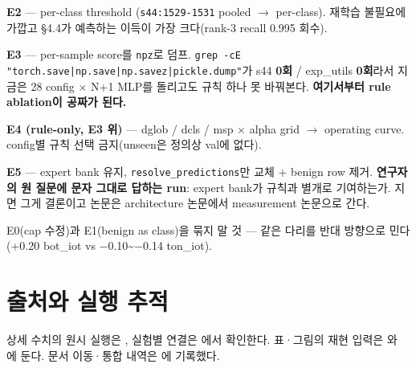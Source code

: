\textbf{E2} — per-class threshold (\texttt{s44:1529\allowbreak{}-\allowbreak{}1531} pooled  \ensuremath{\rightarrow}  per-class). 재학습 불필요에 가깝고 §4.4가 예측하는 이득이 가장 크다(rank-3 recall 0.995 회수).

\textbf{E3} — per-sample score를 \texttt{npz}로 덤프. \texttt{grep -\allowbreak{}cE\allowbreak{} "torch.\allowbreak{}save|np.\allowbreak{}save|np.\allowbreak{}savez|pi\allowbreak{}ckle.\allowbreak{}dum\allowbreak{}p"}가 s44 \textbf{0회} /\allowbreak{} exp\_\allowbreak{}utils \textbf{0회}라서 지금은 28 config × N+\allowbreak{}1 MLP를 돌리고도 규칙 하나 못 바꿔본다. \textbf{여기서부터 rule ablation이 공짜가 된다.}

\textbf{E4 (rule-only, E3 위)} — dglob /\allowbreak{} dcls /\allowbreak{} msp × alpha grid  \ensuremath{\rightarrow}  operating curve. config별 규칙 선택 금지(unseen은 정의상 val에 없다).

\textbf{E5} — expert bank 유지, \texttt{resolve\_\allowbreak{}\allowbreak{}predicti\allowbreak{}ons}만 교체 +\allowbreak{} benign row 제거. \textbf{연구자의 원 질문에 문자 그대로 답하는 run}: expert bank가 규칙과 별개로 기여하는가. 지면 그게 결론이고 논문은 architecture 논문에서 measurement 논문으로 간다.

E0(cap 수정)과 E1(benign as class)을 묶지 말 것 — 같은 다리를 반대 방향으로 민다 (+\allowbreak{}0.20 bot\_\allowbreak{}iot vs −0.10\textasciitilde{}−0.14 ton\_\allowbreak{}iot).



\section*{출처와 실행 추적}

상세 수치의 원시 실행은 , 실험별 연결은 에서 확인한다. 표·그림의 재현 입력은 와 에 둔다. 문서 이동·통합 내역은 에 기록했다.


